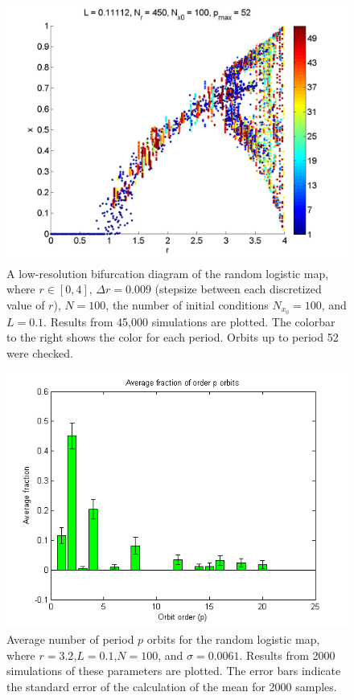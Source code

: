\begin{figure}[H]\linespread{1}
\caption[Random logistic map bifurcation diagram, low resolution]{A
  low-resolution bifurcation diagram of the random
logistic map, where $r \in [0,4]$, $\Delta r = 0.009$ (stepsize
between each discretized value of $r$), $N=100$, the
number of initial conditions $N_{x_0}=100$, and $L=0.1$. Results from
45,000 simulations are plotted. The colorbar to the right shows the
color for each period. Orbits up to period 52 were checked.}\label{fig:rlogbif_low}
	\begin{center}
          \includegraphics[scale=0.48]{figs/rlog_bif_L_01_low.png}
	\end{center}
\end{figure}
\begin{figure}[H]\linespread{1}
\caption[Average number of period $p$ orbits for the random logistic
map]{Average number of period $p$ orbits for the random logistic
map, where $r =3.2$,$L=0.1$,$N=100$, and $\sigma = 0.0061$. Results from 2000
simulations of these parameters are plotted. The error bars indicate
the standard error of the calculation of the mean for 2000 samples.}\label{fig:rloghist}
	\begin{center}
          \includegraphics[scale=0.65]{figs/rlog_hist_r32_L01.png}
	\end{center}
\end{figure}

